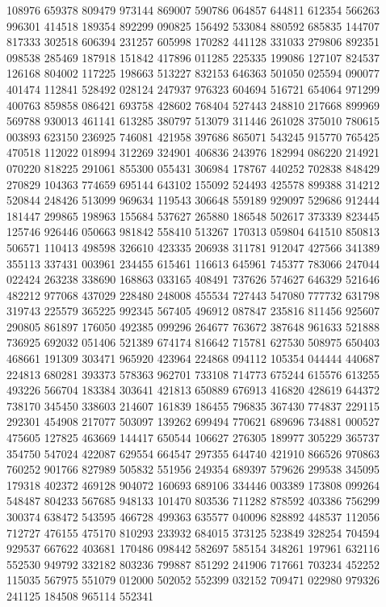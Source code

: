 {108976 659378 809479 973144 869007 590786 064857 644811 612354 566263 996301%
414518 189354 892299 090825 156492 533084 880592 685835 144707 817333 302518%
606394 231257 605998 170282 441128 331033 279806 892351 098538 285469 187918%
151842 417896 011285 225335 199086 127107 824537 126168 804002 117225 198663%
513227 832153 646363 501050 025594 090077 401474 112841 528492 028124 247937%
976323 604694 516721 654064 971299 400763 859858 086421 693758 428602 768404%
527443 248810 217668 899969 569788 930013 461141 613285 380797 513079 311446%
261028 375010 780615 003893 623150 236925 746081 421958 397686 865071 543245%
915770 765425 470518 112022 018994 312269 324901 406836 243976 182994 086220%
214921 070220 818225 291061 855300 055431 306984 178767 440252 702838 848429%
270829 104363 774659 695144 643102 155092 524493 425578 899388 314212 520844%
248426 513099 969634 119543 306648 559189 929097 529686 912444 181447 299865%
198963 155684 537627 265880 186548 502617 373339 823445 125746 926446 050663%
981842 558410 513267 170313 059804 641510 850813 506571 110413 498598 326610%
423335 206938 311781 912047 427566 341389 355113 337431 003961 234455 615461%
116613 645961 745377 783066 247044 022424 263238 338690 168863 033165 408491%
737626 574627 646329 521646 482212 977068 437029 228480 248008 455534 727443%
547080 777732 631798 319743 225579 365225 992345 567405 496912 087847 235816%
811456 925607 290805 861897 176050 492385 099296 264677 763672 387648 961633%
521888 736925 692032 051406 521389 674174 816642 715781 627530 508975 650403%
468661 191309 303471 965920 423964 224868 094112 105354 044444 440687 224813%
680281 393373 578363 962701 733108 714773 675244 615576 613255 493226 566704%
183384 303641 421813 650889 676913 416820 428619 644372 738170 345450 338603%
214607 161839 186455 796835 367430 774837 229115 292301 454908 217077 503097%
139262 699494 770621 689696 734881 000527 475605 127825 463669 144417 650544%
106627 276305 189977 305229 365737 354750 547024 422087 629554 664547 297355%
644740 421910 866526 970863 760252 901766 827989 505832 551956 249354 689397%
579626 299538 345095 179318 402372 469128 904072 160693 689106 334446 003389%
173808 099264 548487 804233 567685 948133 101470 803536 711282 878592 403386%
756299 300374 638472 543595 466728 499363 635577 040096 828892 448537 112056%
712727 476155 475170 810293 233932 684015 373125 523849 328254 704594 929537%
667622 403681 170486 098442 582697 585154 348261 197961 632116 552530 949792%
332182 803236 799887 851292 241906 717661 703234 452252 115035 567975 551079%
012000 502052 552399 032152 709471 022980 979326 241125 184508 965114 552341%
}
